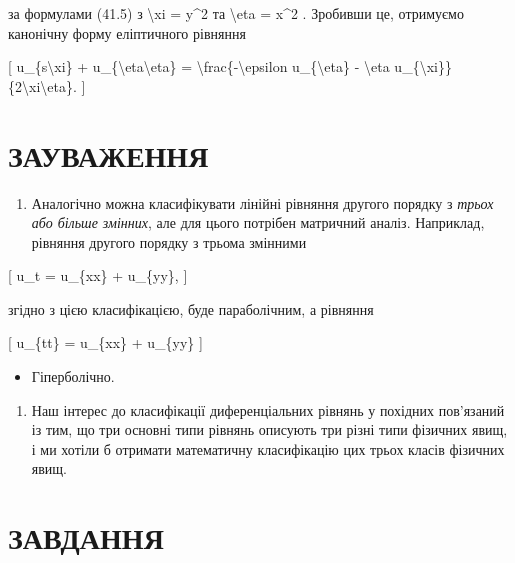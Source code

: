\documentclass[
]{article}
\providecommand{\tightlist}{%
  \setlength{\itemsep}{0pt}\setlength{\parskip}{0pt}}
\begin{document}
за формулами (41.5) з \textbackslash xi = y\^{}2 та \textbackslash eta =
x\^{}2 . Зробивши це, отримуємо канонічну форму еліптичного рівняння

{[} u\_\{s\textbackslash xi\} +
u\_\{\textbackslash eta\textbackslash eta\} =
\textbackslash frac\{-\textbackslash epsilon u\_\{\textbackslash eta\} -
\textbackslash eta
u\_\{\textbackslash xi\}\}\{2\textbackslash xi\textbackslash eta\}. {]}

\section{ЗАУВАЖЕННЯ}\label{ux437ux430ux443ux432ux430ux436ux435ux43dux43dux44f-5}

\begin{enumerate}
\def\labelenumi{\arabic{enumi}.}
\tightlist
\item
  Аналогічно можна класифікувати лінійні рівняння другого порядку з
  \emph{трьох або більше змінних}, але для цього потрібен матричний
  аналіз. Наприклад, рівняння другого порядку з трьома змінними
\end{enumerate}

{[} u\_t = u\_\{xx\} + u\_\{yy\}, {]}

згідно з цією класифікацією, буде параболічним, а рівняння

{[} u\_\{tt\} = u\_\{xx\} + u\_\{yy\} {]}

\begin{itemize}
\tightlist
\item
  Гіперболічно.
\end{itemize}

\begin{enumerate}
\def\labelenumi{\arabic{enumi}.}
\setcounter{enumi}{1}
\tightlist
\item
  Наш інтерес до класифікації диференціальних рівнянь у похідних
  пов'язаний із тим, що три основні типи рівнянь описують три різні типи
  фізичних явищ, і ми хотіли б отримати математичну класифікацію цих
  трьох класів фізичних явищ.
\end{enumerate}

\section{ЗАВДАННЯ}\label{ux437ux430ux432ux434ux430ux43dux43dux44f-9}
\end{document}
